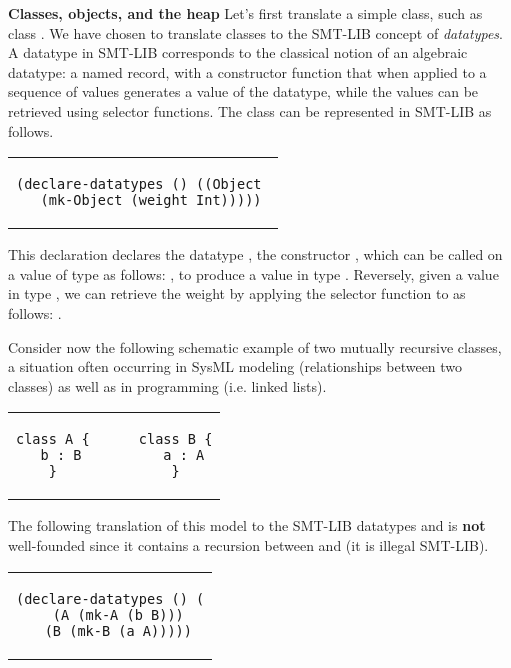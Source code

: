 \textbf{Classes, objects, and the heap} Let's first translate a simple
class, such as class .  We have chosen to translate
classes to the SMT-LIB concept of {\em datatypes}. A datatype in
SMT-LIB corresponds to the classical notion of an algebraic datatype:
a named record, with a constructor function that when applied to a
sequence of values generates a value of the datatype, while the values
can be retrieved using selector functions.  The class 
can be represented in SMT-LIB as follows.

\lstset{language=SMT,numbers=none}

\begin{center}
\begin{tabular}{c}
\begin{lstlisting}
(declare-datatypes () ((Object 
  (mk-Object (weight Int)))))
\end{lstlisting}
\end{tabular}
\end{center}

This declaration declares the datatype , the constructor
, which can be called on a value  of type
 as follows: , to produce a value in
type . Reversely, given a value  in type
, we can retrieve the weight by applying the selector
function  to  as follows: .

Consider now the following schematic example of two mutually recursive
classes, a situation often occurring in SysML modeling (relationships
between two classes) as well as in programming (i.e. linked lists).

\lstset{language=K,numbers=none}

\begin{center}
\begin{tabular}{c}
\begin{lstlisting}
class A {      class B {
  b : B          a : A
}              }
\end{lstlisting}
\end{tabular}
\end{center}

The following translation of this model to the SMT-LIB datatypes
 and  is {\bf not} well-founded since it contains a
recursion between  and  (it is illegal SMT-LIB).

\lstset{language=SMT,numbers=none}

\begin{center}
\begin{tabular}{c}
\begin{lstlisting}
(declare-datatypes () (
  (A (mk-A (b B)))
  (B (mk-B (a A)))))
\end{lstlisting}
\end{tabular}
\end{center}

